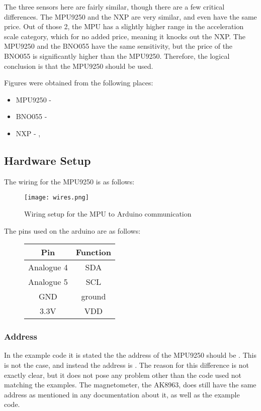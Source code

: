 The three sensors here are fairly similar, though there are a few critical differences.
The MPU9250 and the NXP are very similar, and even have the same price.
Out of those 2, the MPU has a slightly higher range in the acceleration scale category, which for no added price, meaning it knocks out the NXP.
The MPU9250 and the BNO055 have the same sensitivity, but the price of the BNO055 is significantly higher than the MPU9250.
Therefore, the logical conclusion is that the MPU9250 should be used.

Figures were obtained from the following places:
\begin{itemize}
\item MPU9250 - \cite{mpu}
\item BNO055  - \cite{bno}
\item NXP - \cite{nxp1} , \cite{nxp2}
\end{itemize}


\subsection{Hardware Setup}
The wiring for the MPU9250 is as follows:

\begin{figure}[H]
\centering
\texttt{[image: wires.png]}
\caption{Wiring setup for the MPU to Arduino communication}
\label{fig::wiring}
\end{figure}

The pins used on the arduino are as follows: 
\begin{figure}[H]
\centering
\begin{tabular}{|c|c|}
\hline
\textbf{Pin} & \textbf{Function} \\ \hline
Analogue 4 & SDA \\ \hline
Analogue 5 & SCL \\ \hline
GND        & ground  \\ \hline
3.3V       & VDD     \\ \hline
\end{tabular}
\end{figure}

\subsubsection{Address}
In the example code it is stated the the address of the MPU9250 should be .
This is not the case, and instead the address is .
The reason for this difference is not exactly clear, but it does not pose any problem other than the code used not matching the examples.
The magnetometer, the AK8963, does still have the same address as mentioned in any documentation about it, as well as the example code.
\newpage    
    